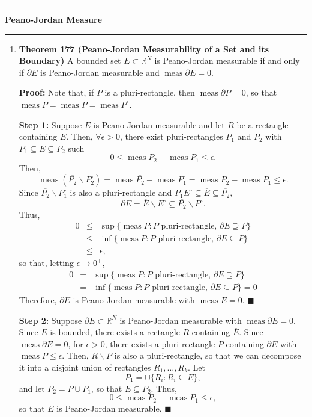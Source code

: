 \documentclass[11pt]{article}
\renewcommand{\qed}{\quad $\blacksquare$}
\newcommand{\meas}{\operatorname{meas}}
\newcommand{\pjm}{Peano-Jordan measurable }
\begin{document}
\hrule
{\Large \bf Peano-Jordan Measure}
\vspace{1mm}
\hrule
\begin{enumerate}
\item \textbf{Theorem 177 (Peano-Jordan Measurability of a Set and its
                                                                    Boundary)}
A bounded set $E \subset \mathbb{R}^N$ is \pjm if and only if $\partial E$ is
\pjm and $\meas \partial E = 0$.

{\bf Proof:} Note that, if $P$ is a pluri-rectangle, then
$\meas \partial P = 0$, so that
$\meas P = \meas \overline{P} = \meas P^{\circ}$.

{\bf Step 1:} Suppose $E$ is \pjm and let $R$ be a rectangle containing $E$.
Then, $\forall \epsilon > 0$, there exist pluri-rectangles $P_1$ and $P_2$
with $P_1 \subseteq E \subseteq P_2$ such
\[0 \leq \meas P_2 - \meas P_1 \leq \epsilon.\] Then,
\[\meas (\overline{P_2}\backslash P_2^{\circ})
 = \meas \overline{P_2} - \meas P_1^{\circ}
 = \meas P_2 - \meas P_1
 \leq \epsilon.\]
Since $\overline{P_2}\backslash P_1^{\circ}$ is also a pluri-rectangle and
$P_1^{\circ} E^{\circ} \subseteq \overline{E} \subseteq \overline{P_2}$,
\[\partial E
 = \overline{E}\backslash E^{\circ}
 \subseteq \overline{P_2}\backslash P^{\circ}.\]
Thus,
\begin{eqnarray*}
0 & \leq & \sup\{\meas P: P\mbox{ pluri-rectangle, }\partial E\supseteq P\} \\
  & \leq & \inf\{\meas P: P\mbox{ pluri-rectangle, }\partial E\subseteq P\} \\
  & \leq & \epsilon,
\end{eqnarray*}
so that, letting $\epsilon \rightarrow 0^+$,
\begin{eqnarray*}
0 & = & \sup\{\meas P : P\mbox{ pluri-rectangle, }\partial E\supseteq P\} \\
  & = & \inf\{\meas P : P\mbox{ pluri-rectangle, }\partial E\subseteq P\}
    = 0
\end{eqnarray*}
Therefore, $\partial E$ is \pjm with $\meas E = 0$. \qed

{\bf Step 2:} Suppose $\partial E \subset \mathbb{R}^N$ is \pjm with
$\meas \partial E = 0$. Since $E$ is bounded, there exists a rectangle $R$
containing $\overline{E}$. Since $\meas \partial E = 0$, for $\epsilon > 0$,
there exists a pluri-rectangle $P$ containing $\partial E$ with
$\meas P \leq \epsilon$. Then, $R \backslash P$ is also a pluri-rectangle, so
that we can decompose it into a disjoint union of rectangles $R_1,\ldots,R_k$.
Let \[P_1 = \cup \{R_i : R_i \subseteq E\},\] and let $P_2 = P \cup P_1$, so
that $E \subseteq P_2$. Thus,
\[0 \leq \meas P_2 - \meas P_1 \leq \epsilon,\] so that $E$ is Peano-Jordan
measurable. \qed


\end{enumerate}
\end{document}
